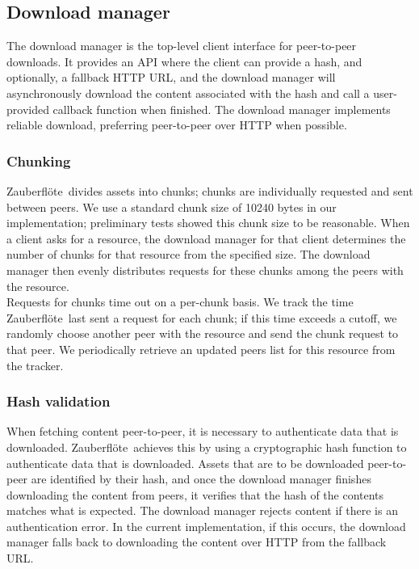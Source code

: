 \documentclass[letterpaper,twocolumn,10pt]{article}
\newcommand{\zbf}{Zauberfl\"{o}te}
\begin{document}
\subsection{Download manager}

The download manager is the top-level client interface for peer-to-peer
downloads. It provides an API where the client can provide a hash, and
optionally, a fallback HTTP URL, and the download manager will asynchronously
download the content associated with the hash and call a user-provided callback
function when finished. The download manager implements reliable download,
preferring peer-to-peer over HTTP when possible.

\subsubsection{Chunking}

\zbf\ divides assets into chunks; chunks are individually requested and
sent between peers. We use a standard chunk size of 10240 bytes in our
implementation; preliminary tests showed this chunk size to be reasonable.
When a client asks for a resource, the download manager for that client
determines the number of chunks for that resource from the specified size.
The download manager then evenly distributes requests for these chunks
among the peers with the resource. \\
Requests for chunks time out on a per-chunk basis. We track the time \zbf\
last sent a request for each chunk; if this time exceeds a cutoff, we randomly
choose another peer with the resource and send the chunk request to that
peer. We periodically retrieve an updated peers list for this resource
from the tracker.

\subsubsection{Hash validation}

When fetching content peer-to-peer, it is necessary to authenticate data that
is downloaded. \zbf\ achieves this by using a cryptographic hash function to
authenticate data that is downloaded. Assets that are to be downloaded
peer-to-peer are identified by their hash, and once the download manager
finishes downloading the content from peers, it verifies that the hash of the
contents matches what is expected. The download manager rejects content if
there is an authentication error. In the current implementation, if this
occurs, the download manager falls back to downloading the content over HTTP
from the fallback URL.
\end{document}
